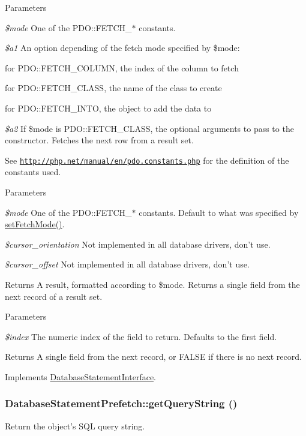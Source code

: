 \begin{DoxyParams}{Parameters}
\item[{\em \$mode}]One of the PDO::FETCH\_\-$\ast$ constants. \item[{\em \$a1}]An option depending of the fetch mode specified by \$mode:
\begin{DoxyItemize}
\item for PDO::FETCH\_\-COLUMN, the index of the column to fetch
\item for PDO::FETCH\_\-CLASS, the name of the class to create
\item for PDO::FETCH\_\-INTO, the object to add the data to 
\end{DoxyItemize}\item[{\em \$a2}]If \$mode is PDO::FETCH\_\-CLASS, the optional arguments to pass to the constructor. Fetches the next row from a result set.\end{DoxyParams}
See \href{http://php.net/manual/en/pdo.constants.php}{\tt http://php.net/manual/en/pdo.constants.php} for the definition of the constants used.


\begin{DoxyParams}{Parameters}
\item[{\em \$mode}]One of the PDO::FETCH\_\-$\ast$ constants. Default to what was specified by \hyperlink{classDatabaseStatementPrefetch_a98cfac25b6be286e48f942d4b0d0d880}{setFetchMode()}. \item[{\em \$cursor\_\-orientation}]Not implemented in all database drivers, don't use. \item[{\em \$cursor\_\-offset}]Not implemented in all database drivers, don't use.\end{DoxyParams}
\begin{DoxyReturn}{Returns}
A result, formatted according to \$mode. Returns a single field from the next record of a result set.
\end{DoxyReturn}

\begin{DoxyParams}{Parameters}
\item[{\em \$index}]The numeric index of the field to return. Defaults to the first field.\end{DoxyParams}
\begin{DoxyReturn}{Returns}
A single field from the next record, or FALSE if there is no next record. 
\end{DoxyReturn}


Implements \hyperlink{interfaceDatabaseStatementInterface_a66325e9222c90de0fc87c201652be9e4}{DatabaseStatementInterface}.\hypertarget{classDatabaseStatementPrefetch_ae5a57e570b7c999b8b4c8b42c636d1af}{
\subsubsection[{getQueryString}]{\setlength{\rightskip}{0pt plus 5cm}DatabaseStatementPrefetch::getQueryString ()}}
\label{classDatabaseStatementPrefetch_ae5a57e570b7c999b8b4c8b42c636d1af}
Return the object's SQL query string. 

